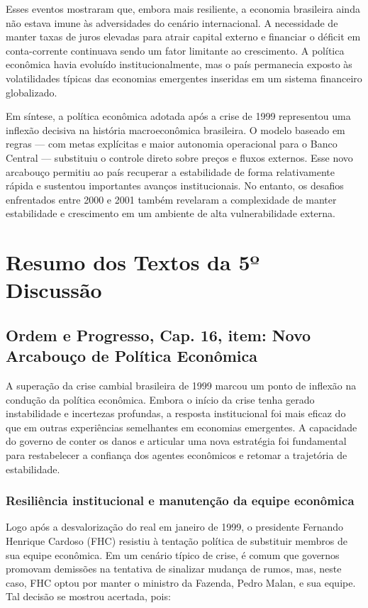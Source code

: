 \documentclass[a4paper,12pt]{article}[abntex2]
\begin{document}
Esses eventos mostraram que, embora mais resiliente, a economia brasileira ainda não estava imune às adversidades do cenário internacional. A necessidade de manter taxas de juros elevadas para atrair capital externo e financiar o déficit em conta-corrente continuava sendo um fator limitante ao crescimento. A política econômica havia evoluído institucionalmente, mas o país permanecia exposto às volatilidades típicas das economias emergentes inseridas em um sistema financeiro globalizado.

Em síntese, a política econômica adotada após a crise de 1999 representou uma inflexão decisiva na história macroeconômica brasileira. O modelo baseado em regras — com metas explícitas e maior autonomia operacional para o Banco Central — substituiu o controle direto sobre preços e fluxos externos. Esse novo arcabouço permitiu ao país recuperar a estabilidade de forma relativamente rápida e sustentou importantes avanços institucionais. No entanto, os desafios enfrentados entre 2000 e 2001 também revelaram a complexidade de manter estabilidade e crescimento em um ambiente de alta vulnerabilidade externa.

\newpage
\section{\textbf{Resumo dos Textos da 5º Discussão}}
\subsection{\textbf{Ordem e Progresso, Cap. 16, item: Novo Arcabouço de Política Econômica}}

A superação da crise cambial brasileira de 1999 marcou um ponto de inflexão na condução da política econômica. Embora o início da crise tenha gerado instabilidade e incertezas profundas, a resposta institucional foi mais eficaz do que em outras experiências semelhantes em economias emergentes. A capacidade do governo de conter os danos e articular uma nova estratégia foi fundamental para restabelecer a confiança dos agentes econômicos e retomar a trajetória de estabilidade.

\subsubsection{\textbf{Resiliência institucional e manutenção da equipe econômica}}

Logo após a desvalorização do real em janeiro de 1999, o presidente Fernando Henrique Cardoso (FHC) resistiu à tentação política de substituir membros de sua equipe econômica. Em um cenário típico de crise, é comum que governos promovam demissões na tentativa de sinalizar mudança de rumos, mas, neste caso, FHC optou por manter o ministro da Fazenda, Pedro Malan, e sua equipe. Tal decisão se mostrou acertada, pois:
\end{document}
